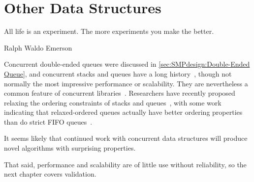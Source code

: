 \QuickQuizEnd

\section{Other Data Structures}
\label{sec:skiplist:Other Data Structures}
%
\epigraph{All life is an experiment.
	  The more experiments you make the better.}
	 {Ralph Waldo Emerson}

Concurrent double-ended queues were discussed in
\cref{sec:SMPdesign:Double-Ended Queue},
and concurrent stacks and queues have a long history~\cite{Treiber86},
though not normally the most impressive performance or scalability.
They are nevertheless a common feature of concurrent
libraries~\cite{PaulMcKenney2013LWNURCUqueuestack}.
Researchers have recently proposed relaxing the ordering constraints
of stacks and queues~\cite{Shavit:2011:DSM:1897852.1897873},
with some work indicating that relaxed-ordered queues actually have
better ordering properties than do strict FIFO
queues~\cite{AndreasHaas2012FIFOisnt,ChristophMKirsch2012FIFOisntTR,AndreasHaas2013CFRelaxedQueues}.

It seems likely that continued work with concurrent data structures will
produce novel algorithms with surprising properties.

That said, performance and scalability are of little use without reliability,
so the next chapter covers validation.

